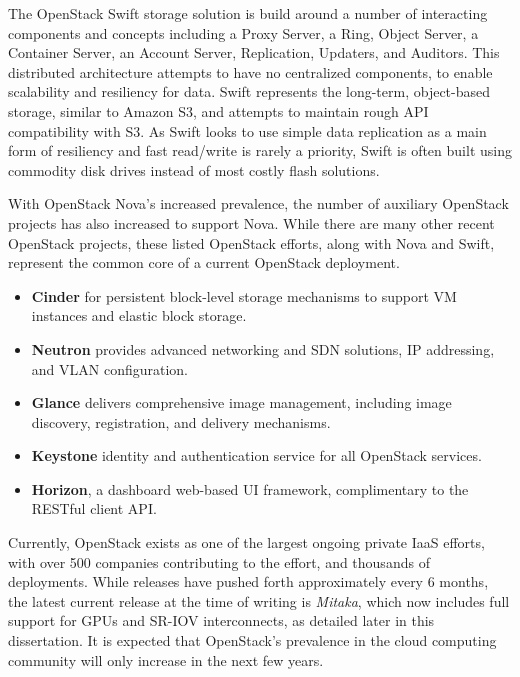 The OpenStack Swift storage solution is build around a number of interacting components and concepts including a Proxy Server, a Ring, Object Server, a Container Server, an Account Server, Replication, Updaters, and Auditors. This distributed architecture attempts to have no centralized components, to enable scalability and resiliency for data.  Swift represents the long-term, object-based storage, similar to Amazon S3, and attempts to maintain rough API compatibility with S3. As Swift looks to use simple data replication as a main form of resiliency and fast read/write is rarely a priority, Swift is often built using commodity disk drives instead of most costly flash solutions.  

With OpenStack Nova's increased prevalence, the number of auxiliary OpenStack projects has also increased to support Nova.  While there are many other recent OpenStack projects, these listed OpenStack efforts, along with Nova and Swift, represent the common core of a current OpenStack deployment. 

\begin{itemize}
\item \textbf{Cinder} for persistent block-level storage mechanisms to support VM instances and elastic block storage.
\item \textbf{Neutron} provides advanced networking and SDN solutions, IP addressing, and VLAN configuration.
\item \textbf{Glance} delivers comprehensive image management, including image discovery, registration, and delivery mechanisms. 
\item \textbf{Keystone} identity and authentication service for all OpenStack services.
\item \textbf{Horizon}, a dashboard web-based UI framework, complimentary to the RESTful client API.   
\end{itemize}

Currently, OpenStack exists as one of the largest ongoing private IaaS efforts, with over 500 companies contributing to the effort, and thousands of deployments. While releases have pushed forth approximately every 6 months, the latest current release at the time of writing is \emph{Mitaka}, which now includes full support for GPUs and SR-IOV interconnects, as detailed later in this dissertation. It is expected that OpenStack's prevalence in the cloud computing community will only increase in the next few years.   



